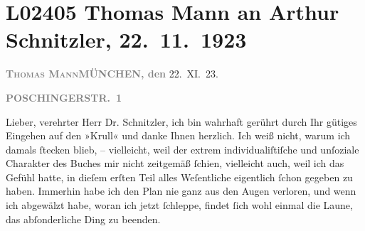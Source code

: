 

\section[Thomas Mann an Arthur Schnitzler, 22. 11. 1923]{L02405 Thomas Mann an Arthur Schnitzler, 22. 11. 1923}
\nopagebreak{}
\rehead{ }\normalsize\beginnumbering{}
\toendnotes[C]{\smallbreak\pagebreak[2]}
\toendnotes[C]{\smallbreak}
\toendnotes[C]{\smallbreak}
\pstart
           {\pb}\textcolor{gray}{\textbf{\textsc{Thomas Mann}}}\hfill \textcolor{gray}{\textbf{MÜNCHEN, den}}{ }22. XI. 23.\pend
           
\pstart
           \raggedleft{}\textcolor{gray}{\textbf{POSCHINGERSTR. 1}}\pend
           
\pstart{}Lieber, verehrter Herr Dr. Schnitzler,\pend\vspace{0.5em}
\pstart
           ich bin wahrhaft gerührt durch Ihr gütiges Eingehen auf den »Krull« und danke Ihnen herzlich. Ich weiß nicht, warum ich damals{ }ſtecken blieb, – vielleicht, weil der extrem individualiſtiſche und unſoziale
               Charakter des Buches mir nicht zeitgemäß{ }ſchien, vielleicht auch, weil ich das Gefühl
               hatte, in dieſem erſten Teil alles We{\pb}ſentliche eigentlich{ }ſchon gegeben zu haben. Immerhin habe ich den Plan nie ganz aus den Augen verloren,
               und wenn ich abgewälzt habe, woran ich jetzt{ }ſchleppe, findet{ }ſich wohl einmal die
               Laune, das abſonderliche Ding zu beenden.\pend
           
